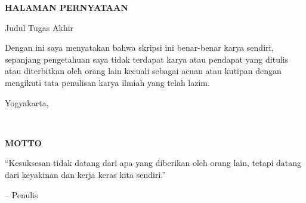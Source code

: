 
\begin{center}
    {\textbf{HALAMAN PERNYATAAN}}\par
    \vspace{0.4cm}
    {Judul Tugas Akhir}\par
    \vspace{0.4cm}
    
    {\textbf{\ThesisTitle}}\par
    \vspace{0.4cm}
\end{center}

{\setlength{\parindent}{0pt}
\setlength{\parskip}{0.5em}

{\noindent Dengan ini saya menyatakan bahwa skripsi ini benar-benar karya sendiri, sepanjang pengetahuan saya tidak terdapat karya atau pendapat yang ditulis atau diterbitkan oleh orang lain kecuali sebagai acuan atau kutipan dengan mengikuti tata penulisan karya ilmiah yang telah lazim.}

}

\vspace{1cm}

\begin{flushright}
    {Yogyakarta, \TanggalPernyataan}\par

    \vspace{2.5cm}

    {\AuthorName} \\
    {\AuthorNIM}
\end{flushright}
\newpage

\begin{center}
    {\textbf{MOTTO}}\par
    \vspace{0.4cm}

    \begin{redshadowbox}
    \centering
    {``Kesuksesan tidak datang dari apa yang diberikan oleh orang lain, tetapi datang dari keyakinan dan kerja keras kita sendiri.''}\par
    \vspace{0.5cm}
    
    -- Penulis\par
    \end{redshadowbox}
    
\end{center}

\newpage

